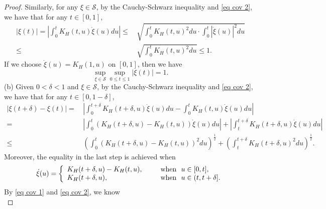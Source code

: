 \documentclass[11pt, reqno]{amsart}
\numberwithin{equation}{section}
\newcommand{\1}{{\bf 1}}
\newcommand{\2}{{\bf 2}}
\begin{document}
 \begin{proof}

 {
Similarly,   for any $\xi \in \mathscr S$, by the Cauchy-Schwarz inequality and \eqref{eq cov 2}, we have  that for any $t\in [0, 1]$,
\begin{align*}
|\xi(t)|=\left|\int_0^t K_H(t, u) \dot \xi(u)du\right|
\le &\,   \sqrt{ \int_0^t K_H(t, u)^2  du \cdot \int_0^t  |\dot \xi(u)|^2du }\\
\le &\,  \sqrt{ \int_0^t K_H(t, u)^2  du}\le 1. 
\end{align*}
If we choose $\dot \xi(u)=K_H(1, u)$ on $[0,1]$, then we have  $$\sup_{\xi \in \mathscr S}\sup_{0\le t\le 1}|\xi(t)|=1.$$
}
\noindent
  (b)  {Given $0<\delta<1$ and $\xi\in\mathscr S$,  by the Cauchy-Schwarz inequality and \eqref{eq cov 2}, we have that for any $t\in [0, 1-\delta]$, 
 \begin{align*}
 |\xi(t+\delta)-\xi(t)|= &\, \left|\int_0^{t+\delta} K_H(t+\delta, u) \dot \xi(u)du-\int_0^{t } K_H(t, u) \dot \xi(u)du \right|\\
 = &\, \left|\int_0^{t}\left( K_H(t+\delta, u)-K_H(t, u)\right)  \dot \xi(u)du \right| +\left|\int_t^{t+\delta} K_H(t+\delta, u) \dot \xi(u)du  \right|\\
 \le &\,  \left(\int_0^{t}\left( K_H(t+\delta, u)-K_H(t, u)\right)^2 du\right)^{\frac12}+  \left(\int_{t}^{t+\delta} K_H(t+\delta, u) ^2 du\right)^{\frac12}.
\end{align*}
}
 { Moreover,  the equality in the last step is achieved when
 \begin{equation*} 
  \dot\xi(u)= \left\{\begin{array}{ll}
K_H(t+\delta, u)-K_H(t, u),  \ \quad &\hbox{ when }\  u\in [0, t],\\
 K_H(t+\delta, u),  \ \quad &\hbox{ when } \ u\in (t, t+\delta].
\end{array}
\right.
 \end{equation*}
 }
 {By \eqref{eq cov 1} and \eqref{eq cov 2}, we know 
 $$
$$}
\end{proof}
\end{document}
